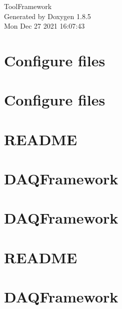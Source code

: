 \documentclass[twoside]{book}
\newcommand{\clearemptydoublepage}{%
  \newpage{\pagestyle{empty}\cleardoublepage}%
}
\begin{document}
\hypersetup{pageanchor=false}
\begin{titlepage}
\vspace*{7cm}
\begin{center}%
{\Large Tool\-Framework }\\
\vspace*{1cm}
{\large Generated by Doxygen 1.8.5}\\
\vspace*{0.5cm}
{\small Mon Dec 27 2021 16:07:43}\\
\end{center}
\end{titlepage}
\clearemptydoublepage
\tableofcontents
\clearemptydoublepage
{}
\hypersetup{pageanchor=true}

\chapter{Configure files}
\label{md_configfiles_README}
\hypertarget{md_configfiles_README}{}

\chapter{Configure files}
\label{md_configfiles_template_README}
\hypertarget{md_configfiles_template_README}{}

\chapter{R\-E\-A\-D\-M\-E}
\label{md_DataModel_README}
\hypertarget{md_DataModel_README}{}

\chapter{D\-A\-Q\-Framework}
\label{md_include_README}
\hypertarget{md_include_README}{}

\chapter{D\-A\-Q\-Framework}
\label{md_lib_README}
\hypertarget{md_lib_README}{}

\chapter{R\-E\-A\-D\-M\-E}
\label{md_README}
\hypertarget{md_README}{}

\chapter{D\-A\-Q\-Framework}
\label{md_src_Store_README}
\hypertarget{md_src_Store_README}{}

\end{document}
